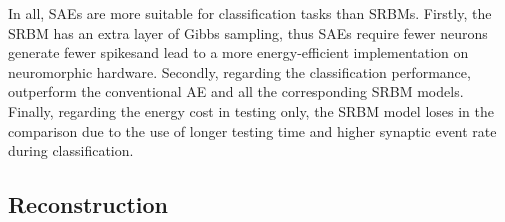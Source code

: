 \DIFaddend In all, SAEs are more suitable for classification tasks than SRBMs.
Firstly, the SRBM has an extra layer of Gibbs sampling, thus SAEs require fewer neurons \DIFdelbegin \DIFdel{, }\DIFdelend \DIFaddbegin {}\DIFaddend generate fewer spikes\DIFdelbegin {}\DIFdelend \DIFaddbegin {}\DIFaddend and lead to a  more energy-efficient implementation on neuromorphic hardware.
Secondly, regarding the classification performance, \DIFdelbegin {}\DIFdelend \DIFaddbegin {}\DIFaddend outperform the conventional AE and all the corresponding SRBM models.
Finally, regarding the energy cost in testing only, the SRBM model loses in the comparison due to the use of \DIFaddbegin {}\DIFaddend longer testing time and \DIFaddbegin {}\DIFaddend higher synaptic event rate during classification.

\subsection{Reconstruction}
\DIFdelbegin %

